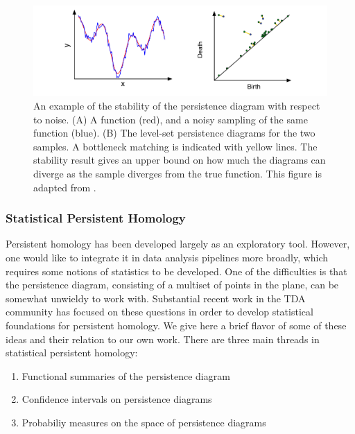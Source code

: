 \begin{figure}
\centering
\includegraphics[]{fig/background/stability_example.pdf}
\caption[Stability Example]{An example of the stability of the persistence diagram with respect to noise. (A) A function (red), and a noisy sampling of the same function (blue). (B) The level-set persistence diagrams for the two samples. A bottleneck matching is indicated with yellow lines. The stability result gives an upper bound on how much the diagrams can diverge as the sample diverges from the true function. This figure is adapted from \cite{Edelsbrunner:2010}.}
\label{fig:bg:stability_example}
\end{figure}

\subsubsection{Statistical Persistent Homology}
\label{bg:tda:ph:statistics}

Persistent homology has been developed largely as an exploratory tool.
However, one would like to integrate it in data analysis pipelines more broadly, which requires some notions of statistics to be developed.
One of the difficulties is that the persistence diagram, consisting of a multiset of points in the plane, can be somewhat unwieldy to work with.
Substantial recent work in the TDA community has focused on these questions in order to develop statistical foundations for persistent homology.
We give here a brief flavor of some of these ideas and their relation to our own work.
There are three main threads in statistical persistent homology:
\begin{enumerate}
\item Functional summaries of the persistence diagram
\item Confidence intervals on persistence diagrams
\item Probabiliy measures on the space of persistence diagrams
\end{enumerate}

